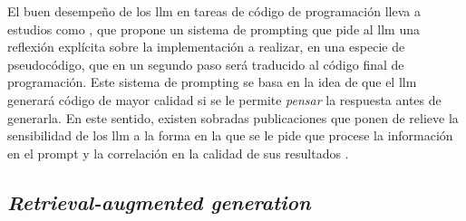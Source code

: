 El buen desempeño de los \gls{llm} en tareas de código de programación lleva a estudios como \cite{liStructuredChainofThoughtPrompting2023}, que propone un sistema de prompting que pide al \gls{llm} una reflexión explícita sobre la implementación a realizar, en una especie de pseudocódigo, que en un segundo paso será traducido al código final de programación. Este sistema de prompting se basa en la idea de que el \gls{llm} generará código de mayor calidad si se le permite \emph{pensar} la respuesta antes de generarla. En este sentido, existen sobradas publicaciones que ponen de relieve la sensibilidad de los \gls{llm} a la forma en la que se le pide que procese la información en el prompt y la correlación en la calidad de sus resultados \citep{zhouLeasttoMostPromptingEnables2023,weiChainofThoughtPromptingElicits2023,LLMPromptingGuide}.
 
\subsection{\emph{Retrieval-augmented generation}}
\label{sec:rag}

